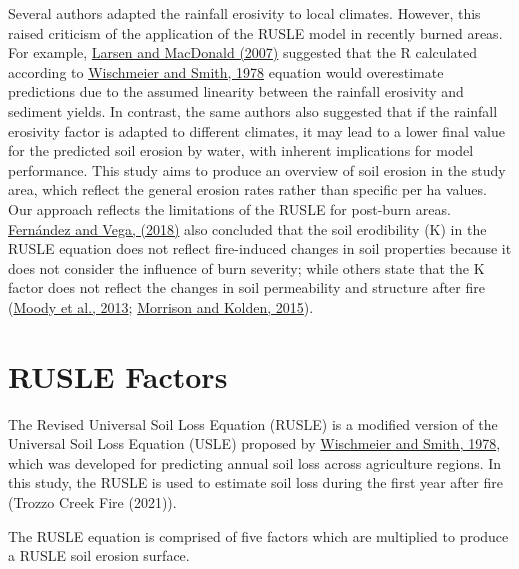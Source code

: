 \documentclass[
]{article}
\begin{document}
Several authors adapted the rainfall erosivity to local climates. However, this raised criticism of the application of the RUSLE model in recently burned areas. For example, \href{https://acsess.onlinelibrary.wiley.com/doi/abs/10.2136/sssaj2007.0432}{Larsen and MacDonald (2007)} suggested that the R calculated according to \href{https://naldc.nal.usda.gov/download/CAT79706928/PDF}{Wischmeier and Smith, 1978} equation would overestimate predictions due to the assumed linearity between the rainfall erosivity and sediment yields. In contrast, the same authors also suggested that if the rainfall erosivity factor is adapted to different climates, it may lead to a lower final value for the predicted soil erosion by water, with inherent implications for model performance. This study aims to produce an overview of soil erosion in the study area, which reflect the general erosion rates rather than specific per ha values. Our approach reflects the limitations of the RUSLE for post-burn areas. \href{https://www.sciencedirect.com/science/article/pii/S0013935117317644}{Fernández and Vega, (2018)} also concluded that the soil erodibility (K) in the RUSLE equation does not reflect fire-induced changes in soil properties because it does not consider the influence of burn severity; while others state that the K factor does not reflect the changes in soil permeability and structure after fire (\href{https://onlinelibrary.wiley.com/doi/10.1002/hyp.13543}{Moody et al., 2013}; \href{https://www.researchgate.net/publication/270163637_Modeling_the_impacts_of_wildfire_on_runoff_and_pollutant_transport_from_coastal_watersheds_to_the_nearshore_environment}{Morrison and Kolden, 2015}).

\hypertarget{factors}{%
\section*{RUSLE Factors}\label{factors}}

The Revised Universal Soil Loss Equation (RUSLE) is a modified version of the Universal Soil Loss Equation (USLE) proposed by \href{https://naldc.nal.usda.gov/download/CAT79706928/PDF}{Wischmeier and Smith, 1978}, which was developed for predicting annual soil loss across agriculture regions. In this study, the RUSLE is used to estimate soil loss during the first year after fire (Trozzo Creek Fire (2021)).

The RUSLE equation is comprised of five factors which are multiplied to produce a RUSLE soil erosion surface.
\end{document}
